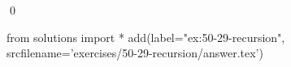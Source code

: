 
\begin{ex}
  \label{ex:50-29-recursion}
  
  \qed
\end{ex}
\begin{python0}
from solutions import *
add(label="ex:50-29-recursion",
    srcfilename='exercises/50-29-recursion/answer.tex')
\end{python0}
